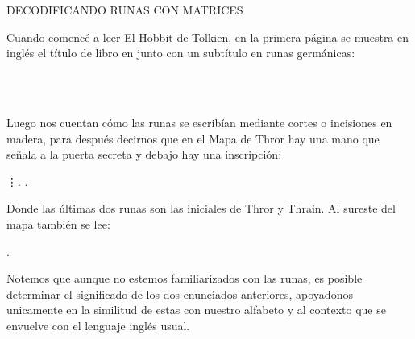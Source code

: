 \documentclass[12pt,a4paper]{article}
\begin{document}
\begin{center}
{\LARGE{DECODIFICANDO RUNAS CON MATRICES}}
\vspace{1cm}
\end{center}
Cuando comencé a leer El Hobbit de Tolkien, en la primera p\'agina se muestra en ingl\'es el t\'itulo de libro en junto con un subt\'itulo en runas germ\'anicas:
\begin{center}
\vspace{0.5cm}
{\LARGE{  }}\\
{\large{}}\\
{\large{   }}
\end{center}
\vspace{0.5cm}

Luego nos cuentan c\'omo las runas se escrib\'ian mediante cortes o incisiones en madera, para despu\'es decirnos que en el Mapa de Thror hay una mano que señala a la puerta secreta y debajo hay una inscripci\'on:
\vspace{0.2cm}
\begin{center}
               \vdots  \textara{\th}. \textara{\th}.
\end{center}
\vspace{0.2cm}

Donde las \'ultimas dos runas son las iniciales de Thror y Thrain. Al sureste del mapa tambi\'en se lee:
\vspace{0.4cm}

                                              .
\vspace{0.4cm}

Notemos que aunque no estemos familiarizados con las runas, es posible determinar el significado de los dos enunciados anteriores, apoyadonos unicamente en la similitud de estas con nuestro alfabeto y al contexto que se envuelve con el lenguaje ingl\'es usual.
\end{document}
